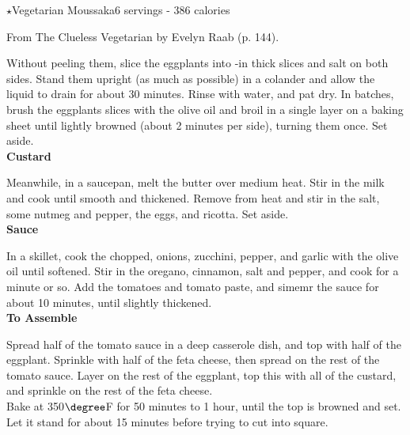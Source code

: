 \begin{recipe}{$\star$Vegetarian Moussaka}{6 servings - 386 calories}{}

\freeform From {\normalfont The Clueless Vegetarian} by Evelyn Raab (p. 144).


Without peeling them, slice the eggplants into -in thick slices and salt on both sides. Stand them upright (as much as possible) in a colander and allow the liquid to drain for about 30 minutes. Rinse with water, and pat dry. In batches, brush the eggplants slices with the olive oil and broil in a single layer on a baking sheet until lightly browned (about 2 minutes per side), turning them once. Set aside.\\

\textbf{Custard}

Meanwhile, in a saucepan, melt the butter over medium heat. Stir in the milk and cook until smooth and thickened. Remove from heat and stir in the salt, some nutmeg and pepper, the eggs, and ricotta. Set aside.\\

\textbf{Sauce}

In a skillet, cook the chopped, onions, zucchini, pepper, and garlic with the olive oil until softened. Stir in the oregano, cinnamon, salt and pepper, and cook for a minute or so. Add the tomatoes and tomato paste, and simemr the sauce for about 10 minutes, until slightly thickened.\\

\textbf{To Assemble}

Spread half of the tomato sauce in a deep casserole dish, and top with half of the eggplant. Sprinkle with half of the feta cheese, then spread on the rest of the tomato sauce. Layer on the rest of the eggplant, top this with all of the custard, and sprinkle on the rest of the feta cheese.\\

Bake at 350$\degree$F for 50 minutes to 1 hour, until the top is browned and set. Let it stand for about 15 minutes before trying to cut into square.

\end{recipe}